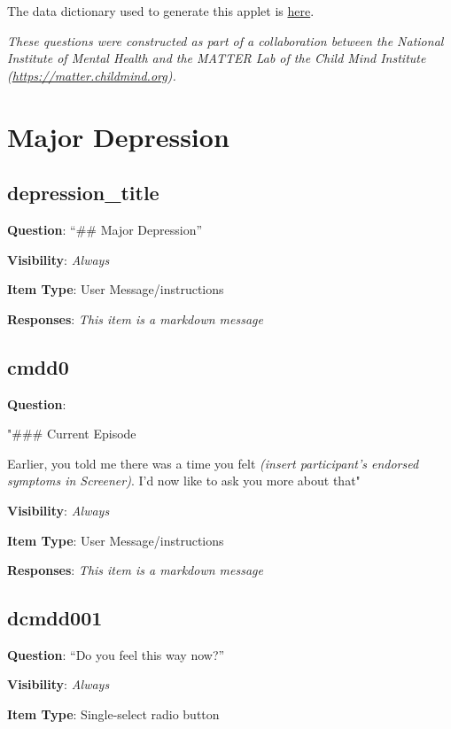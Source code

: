 \documentclass[
]{book}
\begin{document}
The data dictionary used to generate this applet is \href{https://github.com/hotavocado/KSADS_ML_Applet/blob/master/data_dic.csv}{here}.

\emph{These questions were constructed as part of a collaboration between the National Institute of Mental Health and the MATTER Lab of the Child Mind Institute (\url{https://matter.childmind.org}).}

\hypertarget{context_section}{%
\chapter{Major Depression}\label{context_section}}

\hypertarget{depression_title}{%
\section{depression\_title}\label{depression_title}}

\textbf{Question}: ``\#\# Major Depression''

\textbf{Visibility}: \emph{Always}

\textbf{Item Type}: User Message/instructions

\textbf{Responses}: \emph{This item is a markdown message}

\hypertarget{cmdd0}{%
\section{cmdd0}\label{cmdd0}}

\textbf{Question}:

"\#\#\# Current Episode

Earlier, you told me there was a time you felt \emph{(insert participant's endorsed symptoms in Screener)}. I'd now like to ask you more about that"

\textbf{Visibility}: \emph{Always}

\textbf{Item Type}: User Message/instructions

\textbf{Responses}: \emph{This item is a markdown message}

\hypertarget{dcmdd001}{%
\section{dcmdd001}\label{dcmdd001}}

\textbf{Question}: ``Do you feel this way now?''

\textbf{Visibility}: \emph{Always}

\textbf{Item Type}: Single-select radio button
\end{document}

